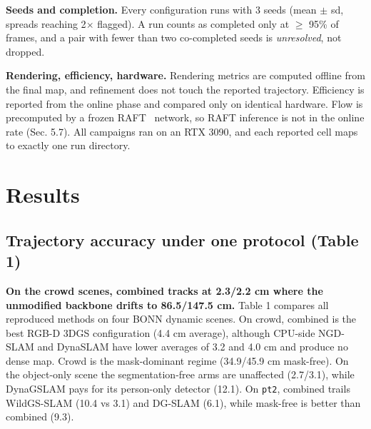 \textbf{Seeds and completion.} Every configuration runs with 3 seeds (mean $\pm$ sd, spreads reaching 2$\times$ flagged). A run counts as completed only at $\ge$ 95\% of frames, and a pair with fewer than two co-completed seeds is \emph{unresolved}, not dropped.


\textbf{Rendering, efficiency, hardware.} Rendering metrics are computed offline from the final map, and refinement does not touch the reported trajectory. Efficiency is reported from the online phase and compared only on identical hardware. Flow is precomputed by a frozen RAFT~\cite{raft} network, so RAFT inference is not in the online rate (Sec. 5.7). All campaigns ran on an RTX 3090, and each reported cell maps to exactly one run directory.




\section{Results}


\subsection{Trajectory accuracy under one protocol (Table 1)}


\textbf{On the crowd scenes, combined tracks at 2.3/2.2 cm where the unmodified backbone drifts to 86.5/147.5 cm.} Table 1 compares all reproduced methods on four BONN dynamic scenes. On crowd, combined is the best RGB-D 3DGS configuration (4.4 cm average), although CPU-side NGD-SLAM and DynaSLAM have lower averages of 3.2 and 4.0 cm and produce no dense map. Crowd is the mask-dominant regime (34.9/45.9 cm mask-free). On the object-only scene the segmentation-free arms are unaffected (2.7/3.1), while DynaGSLAM pays for its person-only detector (12.1). On \texttt{pt2}, combined trails WildGS-SLAM (10.4 vs 3.1) and DG-SLAM (6.1), while mask-free is better than combined (9.3).


